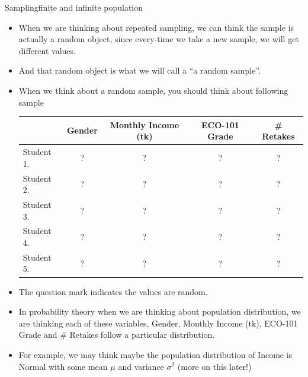 \documentclass[8pt, usepdftitle=false]{beamer}
\begin{document}
\begin{frame}[allowframebreaks]{Sampling}{finite and infinite population}
\begin{itemize}
\begin{itemize}
        \item  Can we think about \emph{a sample which is random}? Ans - YES, 

        \item How? Think about \emph{repeated sampling} (or taking samples again and again and then the sample values will be random right?).
    \end{itemize}

    \item When we are thinking about repeated sampling, we can think the sample is actually a random object, since every-time we take a new sample, we will get different values.

    \item And that random object is what we will call a \alert{``a random sample''}. 

    \framebreak

    \item When we think about a random sample, you should think about following sample


      \medskip
      \begin{tabular}{l|c|c|c|c}
      \hline
       & Gender & Monthly Income (tk) & ECO-101 Grade & \# Retakes\\
      \hline
      Student 1.  & ? & ? & ?& ?\\
      \hline
      Student 2. & ? & ? & ? & ?\\
      \hline
      Student 3.  & ? & ? & ? & ?\\
      \hline
      Student 4. & ? & ? & ? & ? \\
      \hline
      Student 5.  & ? & ? & ? & ? \\
      \hline
      \end{tabular}

    \item The question mark indicates the values are random.

    \item In probability theory when we are thinking about population distribution, we are thinking each of these variables, Gender, Monthly Income (tk), ECO-101 Grade and \# Retakes follow a particular distribution. 

    \item For example, we may think maybe the population distribution of Income is Normal with some mean $\mu$ and variance $\sigma^2$ (more on this later!)






\end{itemize}
\end{frame}
\end{document}
